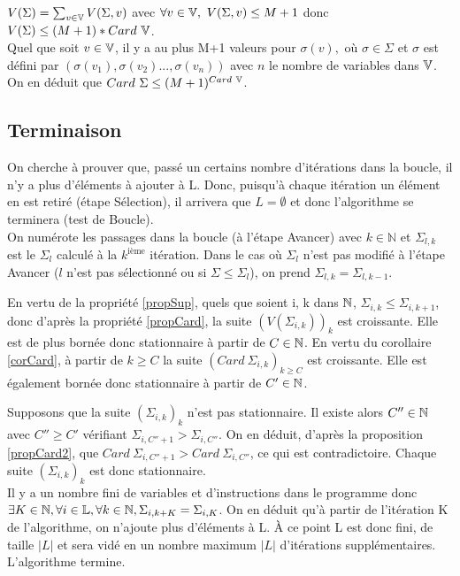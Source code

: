 \begin{pr}
 $V(\Sigma)=\sum_{v\in\mathbb V} V(\Sigma,v)$ avec $\forall v\in\BV,\ V(\Sigma,v)\leq M+1$ donc $V(\Sigma)\leq (M+1)*Card\ \mathbb V$.\\
 Quel que soit $v\in\mathbb V$, il y a au plus M+1 valeurs pour $\sigma(v),$ où $\sigma\in\Sigma$ et $\sigma$ est défini par $(\sigma(v_1), \sigma(v_2)..., \sigma(v_n))$ avec $n$ le nombre de variables dans $\mathbb V$.
 On en déduit que $Card\ \Sigma\leq (M+1)^{Card\ \BV}$. 
\end{pr}

\subsection{Terminaison}
On cherche à prouver que, passé un certains nombre d'itérations dans la boucle, il n'y a plus d'éléments à ajouter à L. Donc, puisqu'à chaque itération un élément en est retiré (étape Sélection), il arrivera que $L=\emptyset$ et donc l'algorithme se terminera (test de Boucle).\\

On numérote les passages dans la boucle (à l'étape Avancer) avec $k\in\mathbb{N}$ et $\Sigma_{l, k}$ est le $\Sigma_l$ calculé à la $k^{\text{ième}}$ itération. Dans le cas où $\Sigma_l$ n'est pas modifié à l'étape Avancer ($l$ n'est pas sélectionné ou si $\Sigma\leq\Sigma_l$), on prend $\Sigma_{l, k}=\Sigma_{l, k-1}$.

En vertu de la propriété \ref{propSup}, quels que soient i, k dans $\mathbb N$, $\Sigma_{i, k}\leq\Sigma_{i, k+1}$, donc d'après la propriété \ref{propCard}, la suite $(V(\Sigma_{i,k}))_k$ est croissante. Elle est de plus bornée donc stationnaire à partir de $C\in\mathbb N$. En vertu du corollaire \ref{corCard}, à partir de $k\geq C$ la suite $(Card\ \Sigma_{i,k})_{k\geq C}$ est croissante. Elle est également bornée donc stationnaire à partir de $C'\in\mathbb N$.


Supposons que la suite $(\Sigma_{i,k})_k$ n'est pas stationnaire. Il existe alors $C''\in\mathbb N$ avec $C''\geq C'$ vérifiant $\Sigma_{i,C''+1}>\Sigma_{i,C''}$. On en déduit, d'après la proposition \ref{propCard2}, que $Card\ \Sigma_{i,C''+1}>Card\ \Sigma_{i,C''}$, ce qui est contradictoire. Chaque suite $(\Sigma_{i,k})_k$ est donc stationnaire.
\\

Il y a un nombre fini de variables et d'instructions dans le programme donc $\exists K\in\mathbb N, \forall i\in\mathbb L, \forall k\in\mathbb N, \Sigma_{i,k+K}=\Sigma_{i,K}$.
On en déduit qu'à partir de l'itération K de l'algorithme, on n'ajoute plus d'éléments à L. À ce point L est donc fini, de taille $|L|$ et sera vidé en un nombre maximum $|L|$ d'itérations supplémentaires.
L'algorithme termine.

